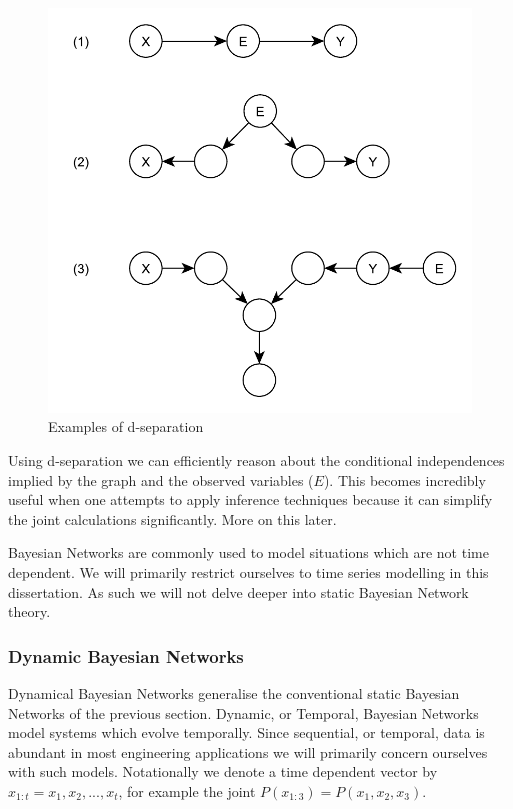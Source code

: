 \documentclass[../masters.tex]{subfiles}
\begin{document}
\begin{figure}[H] 
\centering
\includegraphics[scale=0.5]{dsep.pdf}
\caption{Examples of d-separation}
\label{fig_dsep}
\end{figure}
Using d-separation we can efficiently reason about the conditional independences implied by the graph and the observed variables ($E$). This becomes incredibly useful when one attempts to apply inference techniques because it can simplify the joint calculations significantly. More on this later.

Bayesian Networks are commonly used to model situations which are not time dependent. We will primarily restrict ourselves to time series modelling in this dissertation. As such we will not delve deeper into static Bayesian Network theory.

\subsubsection{Dynamic Bayesian Networks}
Dynamical Bayesian Networks generalise the conventional static Bayesian Networks of the previous section. Dynamic, or Temporal, Bayesian Networks model systems which evolve temporally. Since sequential, or temporal, data is abundant in most engineering applications we will primarily concern ourselves with such models. Notationally we denote a time dependent vector by $x_{1:t}=x_1,x_2,...,x_t$, for example the joint $P(x_{1:3})=P(x_1,x_2,x_3)$.
\end{document}
